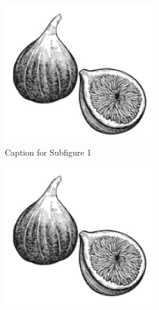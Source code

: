 \documentclass[lettersize,journal]{IEEEtran} %
\begin{document}
\begin{figure}[!t]
    \centering
  
    \begin{subfigure}{0.3\columnwidth}
      \includegraphics[width=\linewidth]{fig1.png}
      \caption{Caption for Subfigure 1}
      \label{fig:subfig1}
    \end{subfigure}
    \hfill
    \begin{subfigure}{0.3\columnwidth}
      \includegraphics[width=\linewidth]{fig1.png}

\end{subfigure}
\end{figure}
\end{document}
